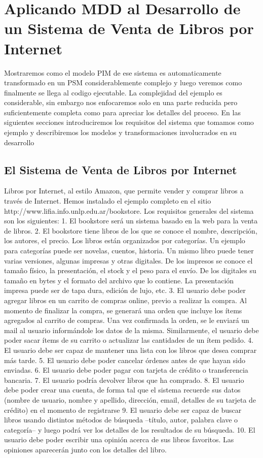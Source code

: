 \section{Aplicando MDD al Desarrollo de un Sistema de Venta de Libros por Internet}

Mostraremos como el modelo PIM de ese sistema es automaticamente transformado en un PSM considerablemente complejo y luego veremos como finalmente se llega al codigo ejecutable. La complejidad del ejemplo es considerable, sin embargo nos enfocaremos solo en una parte reducida pero suficientemente completa como para apreciar los detalles del proceso. En las siguientes secciones introduciremos los requisitos del sistema que tomamos como ejemplo y describiremos los modelos y transformaciones involucrados en su desarrollo

\subsection{El Sistema de Venta de Libros por Internet}


Libros por Internet, al estilo Amazon, que permite vender y comprar libros a través de Internet. Hemos instalado el ejemplo completo en el sitio http://www.lifia.info.unlp.edu.ar/bookstore. Los requisitos generales del sistema son los siguientes: 
1. El bookstore será un sistema basado en la web para la venta de libros.
2. El bookstore tiene libros de los que se conoce el nombre, descripción, los autores, el precio. 
Los libros están organizados por categorías. Un ejemplo para categorías puede ser novelas, cuentos, historia. Un mismo libro puede tener varias versiones, algunas impresas y otras digitales. De los impresos se conoce el tamaño físico, la presentación, el stock y el peso para el envío. De los digitales su tamaño en bytes y el formato del archivo que lo contiene. La presentación impresa puede ser de tapa dura, edición de lujo, etc.
3. El usuario debe poder agregar libros en un carrito de compras online, previo a realizar la compra. Al momento de finalizar la compra, se generará una orden que incluye los ítems agregados al carrito de compras. Una vez confirmada la orden, se le enviará un mail al usuario informándole los datos de la misma. Similarmente, el usuario debe poder sacar ítems de su carrito o actualizar las cantidades de un ítem pedido. 
4. El usuario debe ser capaz de mantener una lista con los libros que desea comprar más tarde. 
5. El usuario debe poder cancelar órdenes antes de que hayan sido enviadas. 
6. El usuario debe poder pagar con tarjeta de crédito o transferencia bancaria. 
7. El usuario podría devolver libros que ha comprado. 
8. El usuario debe poder crear una cuenta, de forma tal que el sistema recuerde sus datos (nombre de usuario, nombre y apellido, dirección, email, detalles de su tarjeta de crédito) en el momento de registrarse
9. El usuario debe ser capaz de buscar libros usando distintos métodos de búsqueda –título, autor, palabra clave o categoría– y luego podrá ver los detalles  de los resultados de su búsqueda. 
10. El usuario debe poder escribir una opinión acerca de sus libros favoritos. Las opiniones aparecerán junto con los detalles del libro.


